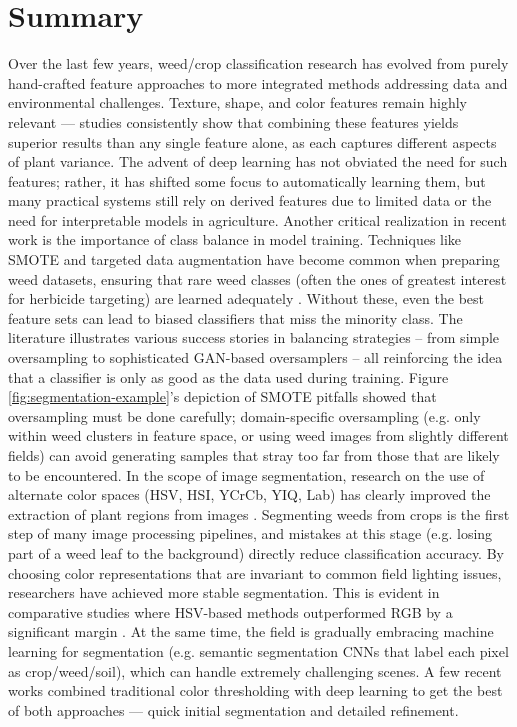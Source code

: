 \documentclass[letterpaper, notitlepage]{report}
\begin{document}
\section{Summary} 
Over the last few years, weed/crop classification research has evolved from purely hand-crafted feature approaches to more integrated methods addressing data and environmental challenges. Texture, shape, and color features remain highly relevant --- studies consistently show that combining these features yields superior results than any single feature alone, as each captures different aspects of plant variance. The advent of deep learning has not obviated the need for such features; rather, it has shifted some focus to automatically learning them, but many practical systems still rely on derived features due to limited data or the need for interpretable models in agriculture.  
%
Another critical realization in recent work is the importance of class balance in model training. Techniques like SMOTE and targeted data augmentation have become common when preparing weed datasets, ensuring that rare weed classes (often the ones of greatest interest for herbicide targeting) are learned adequately \parencite{Ahsen2024-tr, Bazrafkan2024-bl}. Without these, even the best feature sets can lead to biased classifiers that miss the minority class. The literature illustrates various success stories in balancing strategies – from simple oversampling to sophisticated GAN-based oversamplers – all reinforcing the idea that a classifier is only as good as the data used during training. Figure  \ref{fig:segmentation-example}’s depiction of SMOTE pitfalls showed that oversampling must be done carefully; domain-specific oversampling (e.g. only within weed clusters in feature space, or using weed images from slightly different fields) can avoid generating samples that stray too far from those that are likely to be encountered.  
%
In the scope of image segmentation, research on  the use of alternate color spaces (HSV, HSI, YCrCb, YIQ, Lab) has clearly improved the extraction of plant regions from images  \parencite{Wu2021-gt}. Segmenting weeds from crops is the first step of many image processing pipelines, and mistakes at this stage (e.g. losing part of a weed leaf to the background) directly reduce classification accuracy. By choosing color representations that are invariant to common field lighting issues, researchers have achieved more stable segmentation. This is evident in comparative studies where HSV-based methods outperformed RGB by a significant margin \parencite{Priya2019-zw}. At the same time, the field is gradually embracing machine learning for segmentation (e.g. semantic segmentation CNNs that label each pixel as crop/weed/soil), which can handle extremely challenging scenes. A few recent works combined traditional color thresholding with deep learning to get the best of both approaches --- quick initial segmentation and detailed refinement.  
\end{document}

